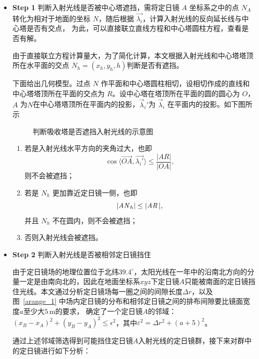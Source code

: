 \documentclass[../main.tex]{subfiles}
\begin{document}
\begin{itemize}
\item \textbf{Step 1} 判断入射光线是否被中心塔遮挡，需将定日镜 \(A\) 坐标系之中的点 \(N_{A}\) 转化为相对于地面的坐标 \(N\)，随后根据 \(\vec {\lambda _{i}}\)，计算入射光线的反向延长线与中心塔是否有交点，
为此，可以直接联立直线方程和中心塔圆柱方程，查看是否有解。

由于直接联立方程计算量大，为了简化计算，本文根据入射光线和中心塔塔顶所在水平面的交点 \(N_{h} = (x _{h} , y_{h}, h)\)判断是否有遮挡。

下面给出几何模型。过点 \(N\) 作平面和中心塔圆柱相切，设相切作成的直线和中心塔塔顶所在平面的交点为 \(R\)。设中心塔在塔顶所在平面的圆的圆心为 \(O\)，\(A\) 为\(N\)在中心塔塔顶所在平面内的投影，\(\vec \lambda _{i} '\)为 \(\vec \lambda _{i}\) 在平面内的投影。如下图所示
%
\begin{figure}[H]
\centering

\caption{\kaishu 判断吸收塔是否遮挡入射光线的示意图}\label{fig:ta}
\end{figure}
%
\begin{enumerate}
\item 若是入射光线水平方向的夹角过大，也即
\begin{equation}
\cos \langle \overrightarrow {OA}, \vec {\lambda _{i} '} \rangle \le \frac{\vert AR \vert }{\vert OA \vert },
\end{equation}
则不会被遮挡；
\item 若是 \(N_{h}\) 更加靠近定日镜一侧，也即
\begin{equation}
\vert {\it A N}_{h}\vert \le \vert {\it AR\,} \vert,
\end{equation}并且 \(N_{h}\) 不在圆内，则不会被遮挡；
\item 否则入射光线会被遮挡。
\end{enumerate}
\item \textbf{Step 2} 判断入射光线是否被相邻定日镜挡住

由于定日镜场的地理位置位于北纬\(39.4^{\circ}\)，太阳光线在一年中的沿南北方向的分量一定是由南向北的，因此在地面坐标系\(xyz\)下定日镜\(A\)只能被南面的定日镜挡住光线。本文通过分析定日镜场每一圈之间的间隙长度\(\Delta r\)，以及图~\ref{arange_1} 中场内定日镜的分布和相邻定日镜之间的排布间隙要比镜面宽度\(a\)至少大\(5 \, \mathrm{m}\)的要求，
确定了一个定日镜\(A\)的邻域：\((x_B - x_A)^2 + (y_B - y_A)^2 \le \epsilon^2\)，其中\(\varepsilon^2=\Delta r^2+(a+5)^2\)。

通过上述邻域筛选得到可能挡住定日镜\(A\)入射光线的定日镜群，接下来对群中的定日镜进行如下分析：


\end{itemize}
\end{document}

